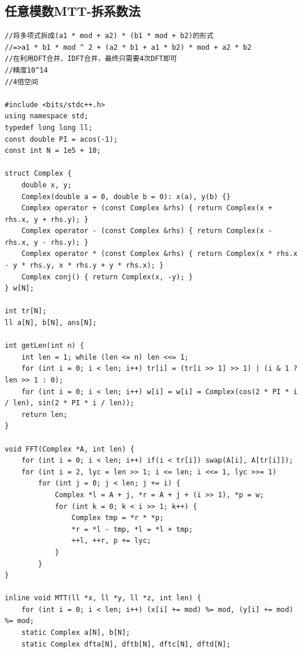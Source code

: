 \documentclass[twoside]{article}
\begin{document}
\subsection{任意模数MTT-拆系数法}
\begin{lstlisting}
//将多项式拆成(a1 * mod + a2) * (b1 * mod + b2)的形式
//=>a1 * b1 * mod ^ 2 + (a2 * b1 + a1 * b2) * mod + a2 * b2
//在利用DFT合并、IDFT合并，最终只需要4次DFT即可
//精度10^14
//4倍空间

#include <bits/stdc++.h>
using namespace std;
typedef long long ll;
const double PI = acos(-1);
const int N = 1e5 + 10;

struct Complex {
    double x, y;
    Complex(double a = 0, double b = 0): x(a), y(b) {}
    Complex operator + (const Complex &rhs) { return Complex(x + rhs.x, y + rhs.y); }
    Complex operator - (const Complex &rhs) { return Complex(x - rhs.x, y - rhs.y); }
    Complex operator * (const Complex &rhs) { return Complex(x * rhs.x - y * rhs.y, x * rhs.y + y * rhs.x); }
    Complex conj() { return Complex(x, -y); }
} w[N];

int tr[N];
ll a[N], b[N], ans[N];

int getLen(int n) {
    int len = 1; while (len <= n) len <<= 1;
    for (int i = 0; i < len; i++) tr[i] = (tr[i >> 1] >> 1) | (i & 1 ? len >> 1 : 0);
    for (int i = 0; i < len; i++) w[i] = w[i] = Complex(cos(2 * PI * i / len), sin(2 * PI * i / len));
    return len;
}

void FFT(Complex *A, int len) {
    for (int i = 0; i < len; i++) if(i < tr[i]) swap(A[i], A[tr[i]]);
    for (int i = 2, lyc = len >> 1; i <= len; i <<= 1, lyc >>= 1)
        for (int j = 0; j < len; j += i) {
            Complex *l = A + j, *r = A + j + (i >> 1), *p = w;
            for (int k = 0; k < i >> 1; k++) {
                Complex tmp = *r * *p;
                *r = *l - tmp, *l = *l + tmp;
                ++l, ++r, p += lyc;
            }
        }
}

inline void MTT(ll *x, ll *y, ll *z, int len) {
    for (int i = 0; i < len; i++) (x[i] += mod) %= mod, (y[i] += mod) %= mod;
    static Complex a[N], b[N];
    static Complex dfta[N], dftb[N], dftc[N], dftd[N];


\end{lstlisting}
\end{document}
